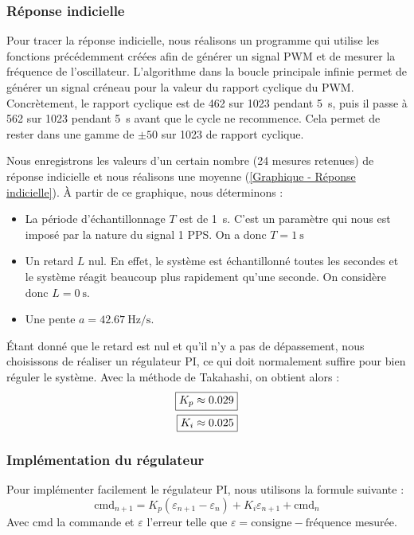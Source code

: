 \documentclass[12pt, a4paper, titlepage]{article}
\newcommand{\Kp}{\ensuremath{K_p}}
\newcommand{\Ki}{\ensuremath{K_i}}
\begin{document}
\subsubsection{Réponse indicielle}

Pour tracer la réponse indicielle, nous réalisons un programme qui utilise les fonctions précédemment créées afin de générer un signal PWM et de mesurer la fréquence de l'oscillateur. L'algorithme dans la boucle principale infinie permet de générer un signal créneau pour la valeur du rapport cyclique du PWM. Concrètement, le rapport cyclique est de 462 sur 1023 pendant \SI{5}{\second}, puis il passe à 562 sur 1023 pendant \SI{5}{\second} avant que le cycle ne recommence. Cela permet de rester dans une gamme de $\pm 50$ sur 1023 de rapport cyclique.

Nous enregistrons les valeurs d'un certain nombre (24 mesures retenues) de réponse indicielle et nous réalisons une moyenne (\ref{Graphique - Réponse indicielle}). À partir de ce graphique, nous déterminons : \nopagebreak \vspace{-0.3cm}
\begin{itemize}
	\item La période d'échantillonnage $T$ est de \SI{1}{\second}. C'est un paramètre qui nous est imposé par la nature du signal 1 PPS. On a donc $\boxed{T = \SI{1}{\second}}$
	\item Un retard $L$ nul. En effet, le système est échantillonné toutes les secondes et le système réagit beaucoup plus rapidement qu'une seconde. On considère donc $\boxed{L = \SI{0}{\second}}$.
	\item Une pente $\boxed{a = \SI{42.67}{\hertz/\second}}$.
\end{itemize}

Étant donné que le retard est nul et qu'il n'y a pas de dépassement, nous choisissons de réaliser un régulateur PI, ce qui doit normalement suffire pour bien réguler le système. Avec la méthode de Takahashi, on obtient alors : \nopagebreak
\begin{align*}
	\Aboxed{\Kp & \approx 0.029} \\
	\Aboxed{\Ki & \approx 0.025}
\end{align*}

\subsubsection{Implémentation du régulateur}

Pour implémenter facilement le régulateur PI, nous utilisons la formule suivante : \nopagebreak
\[
\text{cmd}_{n+1} = \Kp (\varepsilon_{n+1} - \varepsilon_n) + \Ki \varepsilon_{n+1} + \text{cmd}_n
\]
Avec cmd la commande et $\varepsilon$ l'erreur telle que $\varepsilon = \text{consigne} - \text{fréquence mesurée}$.
\end{document}
